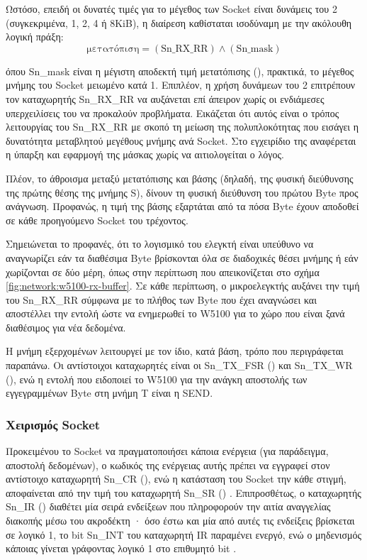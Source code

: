 Ωστόσο, επειδή οι δυνατές τιμές για το μέγεθος των Socket είναι δυνάμεις του 2
(συγκεκριμένα, 1, 2, 4 ή 8KiB), η διαίρεση καθίσταται ισοδύναμη με την ακόλουθη
λογική πράξη:
\begin{equation*}
\text{μετατόπιση} = (\text{Sn\_RX\_RR}) \land (\text{Sn\_mask})
\end{equation*}

\noindent
όπου Sn\_mask είναι η μέγιστη αποδεκτή τιμή μετατόπισης (), πρακτικά,
το μέγεθος μνήμης του Socket μειωμένο κατά 1. Επιπλέον, η χρήση δυνάμεων του 2
επιτρέπουν τον καταχωρητής Sn\_RX\_RR να αυξάνεται επί άπειρον χωρίς οι
ενδιάμεσες υπερχειλίσεις του να προκαλούν προβλήματα. Εικάζεται ότι αυτός είναι
ο τρόπος λειτουργίας του Sn\_RX\_RR με σκοπό τη μείωση της πολυπλοκότητας που
εισάγει η δυνατότητα μεταβλητού μεγέθους μνήμης ανά Socket. Στο εγχειρίδιο της
\textcite[35,43--44]{wiz11:w5100} αναφέρεται η ύπαρξη και εφαρμογή της μάσκας
χωρίς να αιτιολογείται ο λόγος.

Πλέον, το άθροισμα μεταξύ μετατόπισης και βάσης (δηλαδή, της φυσική διεύθυνσης
της πρώτης θέσης της μνήμης S), δίνουν τη φυσική διεύθυνση του πρώτου
Byte προς ανάγνωση. Προφανώς, η τιμή της βάσης εξαρτάται από τα πόσα Byte έχουν
αποδοθεί σε κάθε προηγούμενο Socket του τρέχοντος.

Σημειώνεται το προφανές, ότι το λογισμικό του ελεγκτή είναι υπεύθυνο να
αναγνωρίζει εάν τα διαθέσιμα Byte βρίσκονται όλα σε διαδοχικές θέσει μνήμης ή
εάν χωρίζονται σε δύο μέρη, όπως στην περίπτωση που απεικονίζεται στο σχήμα
\ref{fig:network:w5100-rx-buffer}. Σε κάθε περίπτωση, ο μικροελεγκτής αυξάνει
την τιμή του Sn\_RX\_RR σύμφωνα με το πλήθος των Byte που έχει αναγνώσει και
αποστέλλει την εντολή  ώστε να ενημερωθεί το W5100 για το χώρο που
είναι ξανά διαθέσιμος για νέα δεδομένα.

Η μνήμη εξερχομένων λειτουργεί με τον ίδιο, κατά βάση, τρόπο που περιγράφεται
παραπάνω. Οι αντίστοιχοι καταχωρητές είναι οι Sn\_TX\_FSR () και Sn\_TX\_WR (), ενώ η εντολή
που ειδοποιεί το W5100 για την ανάγκη αποστολής των εγγεγραμμένων Byte στη μνήμη
T είναι η SEND.


\subsubsection{Χειρισμός Socket}

Προκειμένου το Socket να πραγματοποιήσει κάποια ενέργεια (για παράδειγμα,
αποστολή δεδομένων), ο κωδικός της ενέργειας αυτής πρέπει να εγγραφεί στον
αντίστοιχο καταχωρητή Sn\_CR (), ενώ η κατάσταση
του Socket την κάθε στιγμή, αποφαίνεται από την τιμή του καταχωρητή Sn\_SR
() \parencite[26--30]{wiz11:w5100}. Επιπροσθέτως, ο
καταχωρητής Sn\_IR () διαθέτει μία σειρά
ενδείξεων που πληροφορούν την αιτία αναγγελίας διακοπής μέσω του ακροδέκτη
· όσο έστω και μία από αυτές τις ενδείξεις βρίσκεται σε λογικό 1, το
bit Sn\_INT του καταχωρητή IR παραμένει ενεργό, ενώ ο μηδενισμός κάποιας γίνεται
γράφοντας λογικό 1 στο επιθυμητό bit \parencite[27]{wiz11:w5100}.

